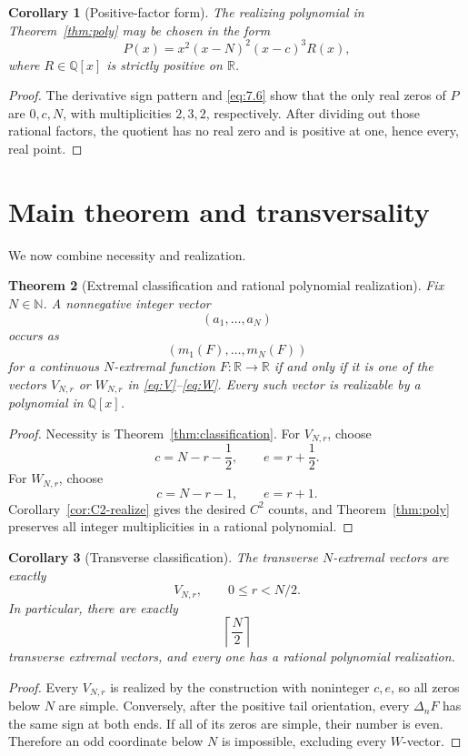 \documentclass[11pt]{article}
\newtheorem{theorem}{Theorem}[section]
\newtheorem{corollary}[theorem]{Corollary}
\theoremstyle{definition}
\theoremstyle{remark}
\newcommand{\R}{\mathbb{R}}
\newcommand{\N}{\mathbb{N}}
\begin{document}
\begin{corollary}[Positive-factor form]\label{cor:factor}
The realizing polynomial in Theorem~\ref{thm:poly} may be chosen in the
form
\[
P(x)=x^2(x-N)^2(x-c)^3R(x),
\]
where \(R\in\mathbb Q[x]\) is strictly positive on \(\R\).
\end{corollary}

\begin{proof}
The derivative sign pattern and \eqref{eq:7.6} show that the only real
zeros of \(P\) are \(0,c,N\), with multiplicities \(2,3,2\), respectively.
After dividing out those rational factors, the quotient has no real zero
and is positive at one, hence every, real point.
\end{proof}

\section{Main theorem and transversality}

We now combine necessity and realization.

\begin{theorem}[Extremal classification and rational polynomial realization]
\label{thm:main}
Fix \(N\in\N\).  A nonnegative integer vector
\[
(a_1,\ldots,a_N)
\]
occurs as
\[
(m_1(F),\ldots,m_N(F))
\]
for a continuous \(N\)-extremal function \(F:\R\to\R\) if and only if
it is one of the vectors \(V_{N,r}\) or \(W_{N,r}\) in
\eqref{eq:V}--\eqref{eq:W}.  Every such vector is realizable by a
polynomial in \(\mathbb Q[x]\).
\end{theorem}

\begin{proof}
Necessity is Theorem~\ref{thm:classification}.
For \(V_{N,r}\), choose
\[
c=N-r-\frac12,\qquad e=r+\frac12.
\]
For \(W_{N,r}\), choose
\[
c=N-r-1,\qquad e=r+1.
\]
Corollary~\ref{cor:C2-realize} gives the desired \(C^2\) counts, and
Theorem~\ref{thm:poly} preserves all integer multiplicities in a rational
polynomial.
\end{proof}

\begin{corollary}[Transverse classification]\label{cor:transverse}
The transverse \(N\)-extremal vectors are exactly
\[
V_{N,r},\qquad 0\le r<N/2.
\]
In particular, there are exactly
\[
\left\lceil\frac N2\right\rceil
\]
transverse extremal vectors, and every one has a rational polynomial
realization.
\end{corollary}

\begin{proof}
Every \(V_{N,r}\) is realized by the construction with noninteger
\(c,e\), so all zeros below \(N\) are simple.
Conversely, after the positive tail orientation, every
\(\Delta_nF\) has the same sign at both ends.  If all of its zeros are
simple, their number is even.  Therefore an odd coordinate below \(N\)
is impossible, excluding every \(W\)-vector.
\end{proof}
\end{document}
